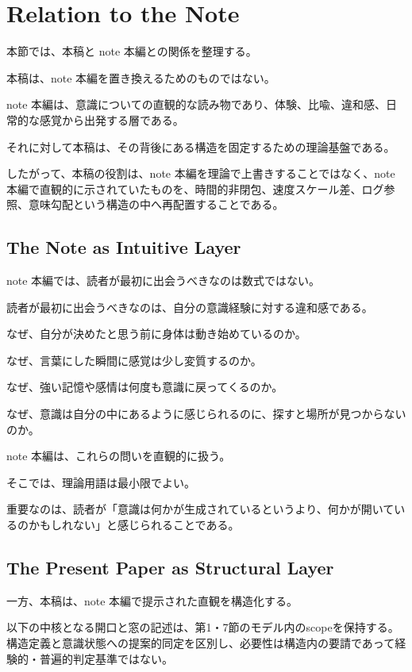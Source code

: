 \section{Relation to the Note}


本節では、本稿と note 本編との関係を整理する。

本稿は、note 本編を置き換えるためのものではない。

note 本編は、意識についての直観的な読み物であり、体験、比喩、違和感、日常的な感覚から出発する層である。

それに対して本稿は、その背後にある構造を固定するための理論基盤である。

したがって、本稿の役割は、note 本編を理論で上書きすることではなく、note 本編で直観的に示されていたものを、時間的非閉包、速度スケール差、ログ参照、意味勾配という構造の中へ再配置することである。

\subsection{The Note as Intuitive Layer}

note 本編では、読者が最初に出会うべきなのは数式ではない。

読者が最初に出会うべきなのは、自分の意識経験に対する違和感である。

なぜ、自分が決めたと思う前に身体は動き始めているのか。

なぜ、言葉にした瞬間に感覚は少し変質するのか。

なぜ、強い記憶や感情は何度も意識に戻ってくるのか。

なぜ、意識は自分の中にあるように感じられるのに、探すと場所が見つからないのか。

note 本編は、これらの問いを直観的に扱う。

そこでは、理論用語は最小限でよい。

重要なのは、読者が「意識は何かが生成されているというより、何かが開いているのかもしれない」と感じられることである。

\subsection{The Present Paper as Structural Layer}

一方、本稿は、note 本編で提示された直観を構造化する。

以下の中核となる開口と窓の記述は、第1・7節のモデル内のscopeを保持する。構造定義と意識状態への提案的同定を区別し、必要性は構造内の要請であって経験的・普遍的判定基準ではない。

